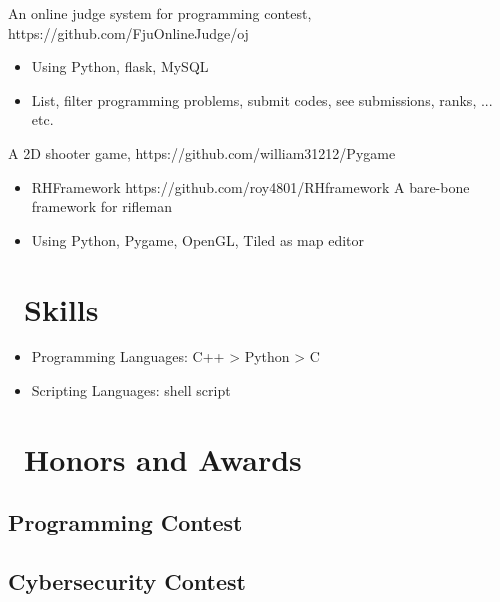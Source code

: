 \documentclass{resume}
\begin{document}
An online judge system for programming contest, {\small https://github.com/FjuOnlineJudge/oj}
\begin{itemize}
  \item Using Python, flask, MySQL
  \item List, filter programming problems, submit codes, see submissions, ranks, ... etc.
\end{itemize}

A 2D shooter game, {\small https://github.com/william31212/Pygame}
\begin{itemize}
  \item RHFramework {\small https://github.com/roy4801/RHframework}
    \subitem A bare-bone framework for rifleman
  \item Using Python, Pygame, OpenGL, Tiled as map editor
\end{itemize}

\section{\faCogs\ Skills}
\begin{itemize}[parsep=0.5ex]
  \item Programming Languages: C++ > Python > C 
  \item Scripting Languages: shell script
\end{itemize}

\section{\faTrophy\ Honors and Awards}

\subsection{Programming Contest}

\subsection{Cybersecurity Contest}
\end{document}
